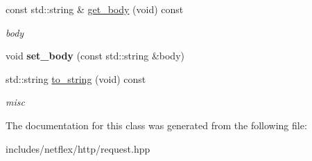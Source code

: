 \begin{DoxyCompactItemize}
\item 
\mbox{\label{classnetflex_1_1http_1_1request_a87b3e0c5dc64ea8b4e7dda4e81254fbe}} 
const std\+::string \& \hyperlink{classnetflex_1_1http_1_1request_a87b3e0c5dc64ea8b4e7dda4e81254fbe}{get\+\_\+body} (void) const
\begin{DoxyCompactList}\small\item\em body \end{DoxyCompactList}\item 
\mbox{\label{classnetflex_1_1http_1_1request_aa47455728e271b519826dc060f829c48}} 
void {\bfseries set\+\_\+body} (const std\+::string \&body)
\item 
\mbox{\label{classnetflex_1_1http_1_1request_a8bc2a51ee9d86cdea633adf8fd22261c}} 
std\+::string \hyperlink{classnetflex_1_1http_1_1request_a8bc2a51ee9d86cdea633adf8fd22261c}{to\+\_\+string} (void) const
\begin{DoxyCompactList}\small\item\em misc \end{DoxyCompactList}\end{DoxyCompactItemize}


The documentation for this class was generated from the following file\+:\begin{DoxyCompactItemize}
\item 
includes/netflex/http/request.\+hpp\end{DoxyCompactItemize}

